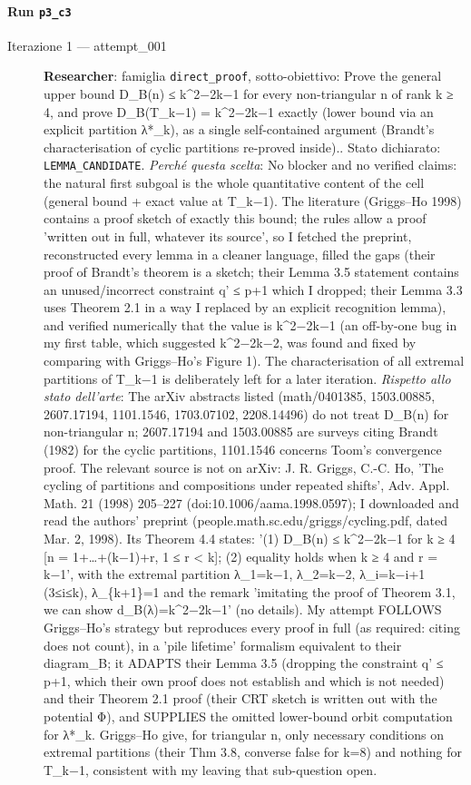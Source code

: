 \documentclass[11pt,a4paper]{article}
\begin{document}
\paragraph{Run \texttt{p3\_c3}}
\begin{description}
\item[Iterazione 1 — attempt\_001]
\textbf{Researcher}: famiglia \texttt{direct\_proof}, sotto-obiettivo: Prove the general upper bound D\_B(n) ≤ k\textasciicircum{}2−2k−1 for every non-triangular n of rank k ≥ 4, and prove D\_B(T\_k−1) = k\textasciicircum{}2−2k−1 exactly (lower bound via an explicit partition λ*\_k), as a single self-contained argument (Brandt's characterisation of cyclic partitions re-proved inside).. Stato dichiarato: \texttt{LEMMA\_CANDIDATE}.
\emph{Perché questa scelta}: No blocker and no verified claims: the natural first subgoal is the whole quantitative content of the cell (general bound + exact value at T\_k−1). The literature (Griggs–Ho 1998) contains a proof sketch of exactly this bound; the rules allow a proof 'written out in full, whatever its source', so I fetched the preprint, reconstructed every lemma in a cleaner language, filled the gaps (their proof of Brandt's theorem is a sketch; their Lemma 3.5 statement contains an unused/incorrect constraint q' ≤ p+1 which I dropped; their Lemma 3.3 uses Theorem 2.1 in a way I replaced by an explicit recognition lemma), and verified numerically that the value is k\textasciicircum{}2−2k−1 (an off-by-one bug in my first table, which suggested k\textasciicircum{}2−2k−2, was found and fixed by comparing with Griggs–Ho's Figure 1). The characterisation of all extremal partitions of T\_k−1 is deliberately left for a later iteration.
\emph{Rispetto allo stato dell'arte}: The arXiv abstracts listed (math/0401385, 1503.00885, 2607.17194, 1101.1546, 1703.07102, 2208.14496) do not treat D\_B(n) for non-triangular n; 2607.17194 and 1503.00885 are surveys citing Brandt (1982) for the cyclic partitions, 1101.1546 concerns Toom's convergence proof. The relevant source is not on arXiv: J. R. Griggs, C.-C. Ho, 'The cycling of partitions and compositions under repeated shifts', Adv. Appl. Math. 21 (1998) 205–227 (doi:10.1006/aama.1998.0597); I downloaded and read the authors' preprint (people.math.sc.edu/griggs/cycling.pdf, dated Mar. 2, 1998). Its Theorem 4.4 states: '(1) D\_B(n) ≤ k\textasciicircum{}2−2k−1 for k ≥ 4 [n = 1+…+(k−1)+r, 1 ≤ r \textless{} k]; (2) equality holds when k ≥ 4 and r = k−1', with the extremal partition λ\_1=k−1, λ\_2=k−2, λ\_i=k−i+1 (3≤i≤k), λ\_\{k+1\}=1 and the remark 'imitating the proof of Theorem 3.1, we can show d\_B(λ)=k\textasciicircum{}2−2k−1' (no details). My attempt FOLLOWS Griggs–Ho's strategy but reproduces every proof in full (as required: citing does not count), in a 'pile lifetime' formalism equivalent to their diagram\_B; it ADAPTS their Lemma 3.5 (dropping the constraint q' ≤ p+1, which their own proof does not establish and which is not needed) and their Theorem 2.1 proof (their CRT sketch is written out with the potential Φ), and SUPPLIES the omitted lower-bound orbit computation for λ*\_k. Griggs–Ho give, for triangular n, only necessary conditions on extremal partitions (their Thm 3.8, converse false for k=8) and nothing for T\_k−1, consistent with my leaving that sub-question open.

\end{description}
\end{document}
